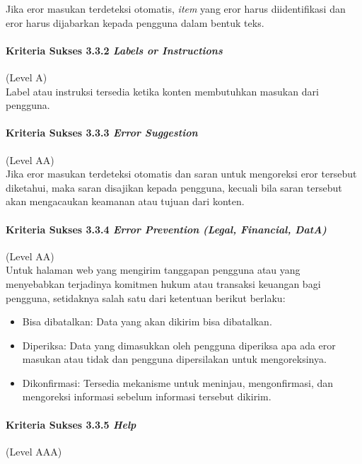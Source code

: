 Jika eror masukan terdeteksi otomatis, \textit{item} yang eror harus diidentifikasi dan eror harus dijabarkan kepada pengguna dalam bentuk teks.

\paragraph{Kriteria Sukses 3.3.2 \textit{Labels or Instructions}}
\label{sec:kriteria_sukses_3.3.2}
(Level A)\\

Label atau instruksi tersedia ketika konten membutuhkan masukan dari pengguna.

\paragraph{Kriteria Sukses 3.3.3 \textit{Error Suggestion}}
\label{sec:kriteria_sukses_3.3.3}
(Level AA)\\

Jika eror masukan terdeteksi otomatis dan saran untuk mengoreksi eror tersebut diketahui, maka saran disajikan kepada pengguna, kecuali bila saran tersebut akan mengacaukan keamanan atau tujuan dari konten.

\paragraph{Kriteria Sukses 3.3.4 \textit{Error Prevention (Legal, Financial, DatA)\\}}
\label{sec:kriteria_sukses_3.3.4}
(Level AA)\\

Untuk halaman web yang mengirim tanggapan pengguna atau yang menyebabkan terjadinya komitmen hukum atau transaksi keuangan bagi pengguna, setidaknya salah satu dari ketentuan berikut berlaku:
\begin{itemize}
	\item Bisa dibatalkan: Data yang akan dikirim bisa dibatalkan.
	\item Diperiksa: Data yang dimasukkan oleh pengguna diperiksa apa ada eror masukan atau tidak dan pengguna dipersilakan untuk mengoreksinya.
	\item Dikonfirmasi: Tersedia mekanisme untuk meninjau, mengonfirmasi, dan mengoreksi informasi sebelum informasi tersebut dikirim.
\end{itemize}

\paragraph{Kriteria Sukses 3.3.5 \textit{Help}}
\label{sec:kriteria_sukses_3.3.5}
(Level AAA)\\

